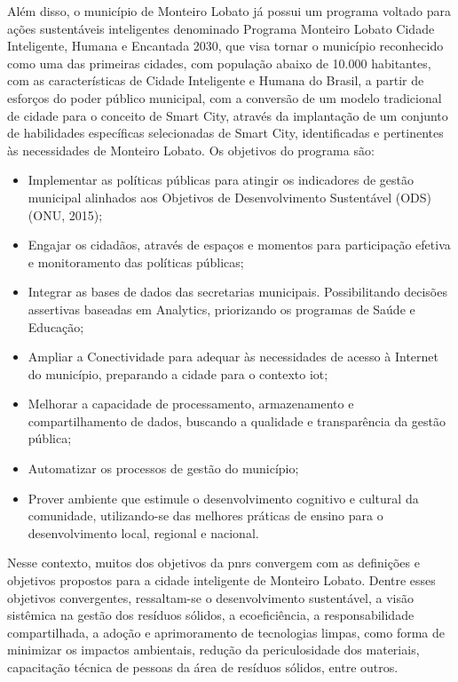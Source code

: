 	Além disso, o município de Monteiro Lobato já possui um programa voltado para ações sustentáveis inteligentes denominado Programa Monteiro Lobato Cidade Inteligente, Humana e Encantada 2030, que visa tornar o município reconhecido como uma das primeiras cidades, com população abaixo de 10.000 habitantes, com as características de Cidade Inteligente e Humana do Brasil, a partir de esforços do poder público municipal, com a conversão de um modelo tradicional de cidade para o conceito de Smart City, através da implantação de um conjunto de habilidades específicas selecionadas de Smart City, identificadas e pertinentes às necessidades de Monteiro Lobato. Os objetivos do programa são:
	
	\begin{itemize}
		\item Implementar as políticas públicas para atingir os indicadores de gestão municipal alinhados aos Objetivos de Desenvolvimento Sustentável (ODS) (ONU, 2015);
	
		\item Engajar os cidadãos, através de espaços e momentos para participação efetiva e monitoramento das políticas públicas;
	
		\item Integrar as bases de dados das secretarias municipais. Possibilitando decisões assertivas baseadas em Analytics, priorizando os programas de Saúde e Educação;
	
		\item Ampliar a Conectividade para adequar às necessidades de acesso à Internet do município, preparando a cidade para o contexto \gls{iot};
	
		\item Melhorar a capacidade de processamento, armazenamento e compartilhamento de dados, buscando a qualidade e transparência da gestão pública;
	
		\item Automatizar os processos de gestão do município;
	
		\item Prover ambiente que estimule o desenvolvimento cognitivo e cultural da comunidade, utilizando-se das melhores práticas de ensino para o desenvolvimento local, regional e nacional.
	\end{itemize}
	
	Nesse contexto, muitos dos objetivos da \gls{pnrs} \cite{brasil:12305} convergem com as definições e objetivos propostos para a cidade inteligente de Monteiro Lobato. Dentre esses objetivos convergentes, ressaltam-se o desenvolvimento sustentável, a visão sistêmica na gestão dos resíduos sólidos, a ecoeficiência, a responsabilidade compartilhada, a adoção e aprimoramento de tecnologias limpas, como forma de minimizar os impactos ambientais, redução da periculosidade dos materiais, capacitação técnica de pessoas da área de resíduos sólidos, entre outros. 
	
